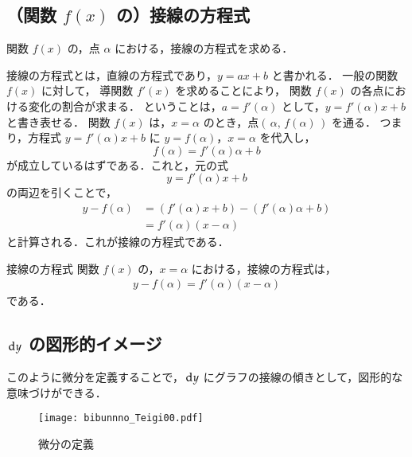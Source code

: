             \subsection{（関数 $f(x)$ の）接線の方程式}
            関数 $f(x)$ の，点 $\alpha$ における，接線の方程式を求める．

            接線の方程式とは，直線の方程式であり，$y=ax+b$ と書かれる．
            一般の関数 $f(x)$ に対して，
            導関数 $f'(x)$ を求めることにより，
            関数 $f(x)$ の各点における変化の割合が求まる．
            ということは，$a=f'(\alpha)$ として，$y=f'(\alpha)x+b$ と書き表せる．
            関数 $f(x)$ は，$x=\alpha$ のとき，点$(\,\alpha,\,f(\alpha)\,)$ を通る．
            つまり，方程式 $y=f'(\alpha)x+b$ に $y=f(\alpha)$，$x=\alpha$ を代入し，
                \begin{equation*}
                    f(\alpha) = f'(\alpha)\alpha + b
                \end{equation*}
            が成立しているはずである．これと，元の式
                \begin{equation*}
                    y=f'(\alpha)x+b
                \end{equation*}
            の両辺を引くことで，
                \begin{align*}
                    y - f(\alpha) &=   \left( f'(\alpha)x      + b \right)
                                      - \left( f'(\alpha)\alpha + b \right) \\
                                  &= f'(\alpha) \left( x-\alpha \right)
                \end{align*}
            と計算される．これが接線の方程式である．\\

            \begin{itembox}[l]{接線の方程式}
            関数 $f(x)$ の，$x=\alpha$ における，接線の方程式は，
            \begin{align}
                y - f(\alpha)=f'(\alpha) \left( x-\alpha \right)
            \end{align}
            である．
            \end{itembox}

            \subsection{$\,\mathrm{d} y$ の図形的イメージ}
                このように微分を定義することで，$\,\mathrm{d} y$ にグラフの接線の傾きとして，図形的な意味づけができる．
                \begin{figure}[hbt]
                    \begin{center}
                        \texttt{[image: bibunnno\_Teigi00.pdf]}
                        \caption{微分の定義}
                        \label{fig:bibunnno_Teigi00}
                    \end{center}
                \end{figure}

